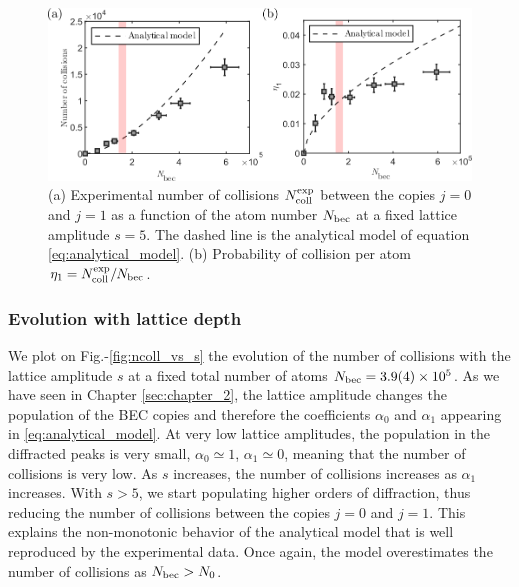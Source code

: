 \begin{figure}
    \centering
    \includegraphics[width=\textwidth]{Fig/Chapter3/ncoll_vs_atom_number.png}
    \caption[Experimental number of collisions and probability of collision per atom as a function of the atom number]{(a) Experimental number of collisions $N_{\rm{coll}}^{\rm{exp}}$ between the copies $j=0$ and $j=1$ as a function of the atom number $N_{\rm{bec}}$ at a fixed lattice amplitude $s=5$. The dashed line is the analytical model of equation \ref{eq:analytical_model}. (b) Probability of collision per atom $\eta_1=N_{\rm{coll}}^{\rm{exp}}/N_{\rm{bec}}$.}
    \label{fig:ncoll_vs_atom_number}
\end{figure}

\subsubsection{Evolution with lattice depth}

 We plot on Fig.-\ref{fig:ncoll_vs_s} the evolution of the number of collisions with the lattice amplitude $s$ at a fixed total number of atoms $N_{\rm{bec}} = 3.9(4) \times 10^5$. As we have seen in Chapter \ref{sec:chapter_2}, the lattice amplitude changes the population of the BEC copies and therefore the coefficients $\alpha_0$ and $\alpha_1$ appearing in \ref{eq:analytical_model}. At very low lattice amplitudes, the population in the diffracted peaks is very small, $\alpha_0 \simeq 1$, $\alpha_1 \simeq 0$, meaning that the number of collisions is very low. As $s$ increases, the number of collisions increases as $\alpha_1$ increases. With $s > 5$, we start populating higher orders of diffraction, thus reducing the number of collisions between the copies $j=0$ and $j=1$. This explains the non-monotonic behavior of the analytical model that is well reproduced by the experimental data. Once again, the model overestimates the number of collisions as $N_{\rm{bec}} > N_0$.
 
